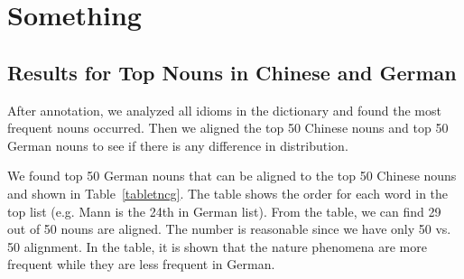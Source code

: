 \section{Something}

\subsection{Results for Top Nouns in Chinese and German}\label{firstresult}
After annotation, we analyzed all idioms in the dictionary and found the most frequent nouns occurred. Then we aligned the top 50 Chinese nouns and top 50 German nouns to see if there is any difference in distribution. 

We found top 50 German nouns that can be aligned to the top 50 Chinese nouns and shown in Table~\ref{tabletncg}. The table shows the order for each word in the top list (e.g. Mann is the 24th in German list). From the table, we can find 29 out of 50 nouns are aligned. The number is reasonable since we have only 50 vs. 50 alignment. In the table, it is shown that the nature phenomena are more frequent while they are less frequent in German. 

